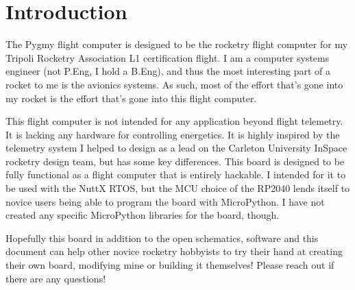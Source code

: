 \part{Introduction}

The Pygmy flight computer is designed to be the rocketry flight computer for my Tripoli Rocketry Association L1
certification flight. I am a computer systems engineer (not P.Eng, I hold a B.Eng), and thus the most interesting part
of a rocket to me is the avionics systems. As such, most of the effort that's gone into my rocket is the effort that's
gone into this flight computer.

This flight computer is not intended for any application beyond flight telemetry. It is lacking any hardware for
controlling energetics. It is highly inspired by the telemetry system I helped to design as a lead on the Carleton
University InSpace rocketry design team, but has some key differences. This board is designed to be fully functional as
a flight computer that is entirely hackable. I intended for it to be used with the NuttX RTOS, but the MCU choice of the
RP2040 lends itself to novice users being able to program the board with MicroPython. I have not created any specific
MicroPython libraries for the board, though.

Hopefully this board in addition to the open schematics, software and this document can help other novice rocketry
hobbyists to try their hand at creating their own board, modifying mine or building it themselves! Please reach out if
there are any questions!
